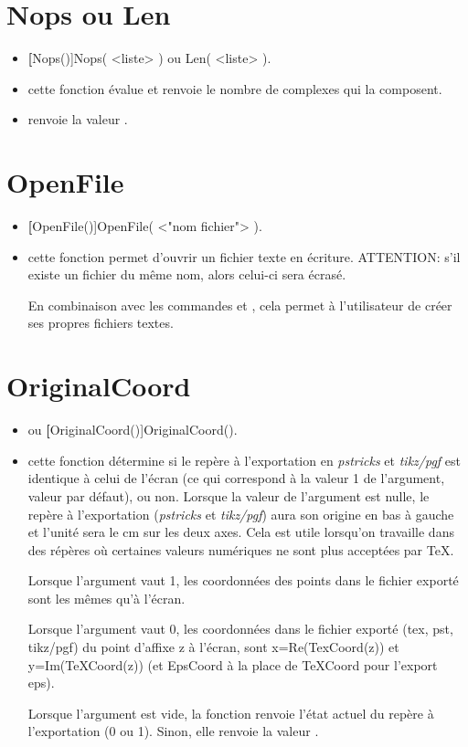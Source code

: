 \section{Nops ou Len}\label{cmdNops}
\begin{itemize}
 \item \util \textbf[Nops()]{Nops( <liste> ) ou Len( <liste> )}.
 \item \desc cette fonction évalue  et renvoie le nombre de complexes qui la composent.
 \item \exem {} renvoie la valeur .
\end{itemize}

\section{OpenFile}\label{cmdOpenFile}

\begin{itemize}
 \item \util \textbf[OpenFile()]{OpenFile( <"nom fichier"> )}. 
 \item \desc cette fonction permet d'ouvrir un fichier texte en écriture. ATTENTION: s'il existe un fichier du même nom, alors celui-ci sera écrasé.

 En combinaison avec les commandes  et , cela permet à l'utilisateur de créer ses propres fichiers textes.
\end{itemize}


\section{OriginalCoord}\label{cmdOriginalCoord}

\begin{itemize}
 \item \util {} ou \textbf[OriginalCoord()]{OriginalCoord()}.
 \item \desc cette fonction détermine si le repère à l'exportation en \textit{pstricks} et \textit{tikz/pgf} est identique à celui de l'écran (ce qui correspond à la valeur 1 de l'argument, valeur par défaut), ou non. Lorsque la valeur de l'argument est nulle, le repère à l'exportation (\textit{pstricks} et \textit{tikz/pgf}) aura son origine en bas à gauche et l'unité sera le cm sur les deux axes. Cela est utile lorsqu'on travaille dans des répères où certaines valeurs numériques ne sont plus acceptées par \TeX. 
 
 Lorsque l'argument vaut 1, les coordonnées des points dans le fichier exporté sont les mêmes qu'à l'écran.

 Lorsque l'argument vaut 0, les coordonnées dans le fichier exporté (tex, pst, tikz/pgf) du point d'affixe z à l'écran, sont x=Re(TexCoord(z)) et y=Im(TeXCoord(z)) (et EpsCoord à la place de TeXCoord pour l'export eps).

 Lorsque l'argument est vide, la fonction renvoie l'état actuel du repère à l'exportation (0 ou 1). Sinon, elle renvoie la valeur \Nil.
\end{itemize}

